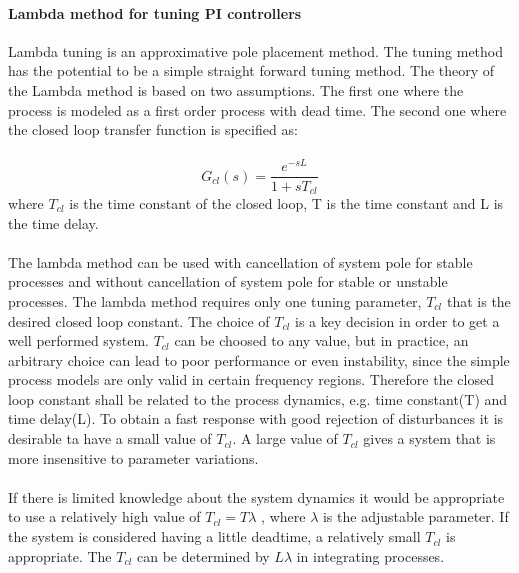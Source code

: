 \paragraph{Lambda method for tuning PI controllers}
Lambda tuning is an approximative pole placement method. The tuning method has the potential to be a simple straight forward tuning method. The theory of the Lambda method is based on two assumptions. The first one where the process is modeled as a first order process with dead time. The second one where the closed loop transfer function is specified as:\\
\\
\begin{equation}
\label{eq:lambda}
G_{cl}(s) = \frac{e^{-sL}}{1+ sT_{cl}}
\end{equation}
where $ T_{cl} $ is the time constant of the closed loop, T is the time constant and L is the time delay.\\
\\
The lambda method can be used with cancellation of system pole for stable processes and without cancellation of system pole for stable or unstable processes. The lambda method requires only one tuning parameter, $ T_{cl} $ that is the desired closed loop constant. The choice of $ T_{cl} $ is a key decision in order to get a well performed system. $ T_{cl} $ can be choosed to any value, but in practice, an arbitrary choice can lead to poor performance or even instability, since the simple process models are only valid in certain frequency regions. Therefore the closed loop constant shall be related to the process dynamics, e.g. time constant(T) and time delay(L). To obtain a fast response with good rejection of disturbances it is desirable ta have a small value of $ T_{cl} $. A large value of $ T_{cl} $  gives a system that is more insensitive to parameter variations. \\
\\
If there is limited knowledge about the system dynamics it would be appropriate to use a relatively high value of $ T_{cl}  =T\lambda $ , where $\lambda$ is the adjustable parameter. If the system is considered having a little deadtime, a relatively small $ T_{cl} $ is appropriate. The $ T_{cl} $ can be determined by $ L\lambda $ in integrating processes. 
\cite{lambda}










